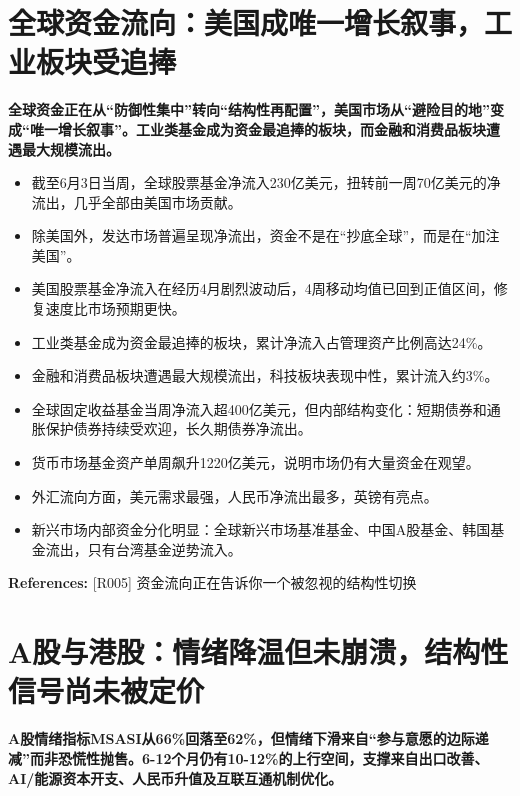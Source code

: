 \documentclass[11pt]{ctexart}
\begin{document}
\section{全球资金流向：美国成唯一增长叙事，工业板块受追捧}
\textbf{全球资金正在从“防御性集中”转向“结构性再配置”，美国市场从“避险目的地”变成“唯一增长叙事”。工业类基金成为资金最追捧的板块，而金融和消费品板块遭遇最大规模流出。}

\begin{itemize}
  \item 截至6月3日当周，全球股票基金净流入230亿美元，扭转前一周70亿美元的净流出，几乎全部由美国市场贡献。
  \item 除美国外，发达市场普遍呈现净流出，资金不是在“抄底全球”，而是在“加注美国”。
  \item 美国股票基金净流入在经历4月剧烈波动后，4周移动均值已回到正值区间，修复速度比市场预期更快。
  \item 工业类基金成为资金最追捧的板块，累计净流入占管理资产比例高达24\%。
  \item 金融和消费品板块遭遇最大规模流出，科技板块表现中性，累计流入约3\%。
  \item 全球固定收益基金当周净流入超400亿美元，但内部结构变化：短期债券和通胀保护债券持续受欢迎，长久期债券净流出。
  \item 货币市场基金资产单周飙升1220亿美元，说明市场仍有大量资金在观望。
  \item 外汇流向方面，美元需求最强，人民币净流出最多，英镑有亮点。
  \item 新兴市场内部资金分化明显：全球新兴市场基准基金、中国A股基金、韩国基金流出，只有台湾基金逆势流入。
\end{itemize}
{\small\color{refgray}\textbf{References:} [R005] 资金流向正在告诉你一个被忽视的结构性切换}

\section{A股与港股：情绪降温但未崩溃，结构性信号尚未被定价}
\textbf{A股情绪指标MSASI从66\%回落至62\%，但情绪下滑来自“参与意愿的边际递减”而非恐慌性抛售。6-12个月仍有10-12\%的上行空间，支撑来自出口改善、AI/能源资本开支、人民币升值及互联互通机制优化。}
\end{document}
